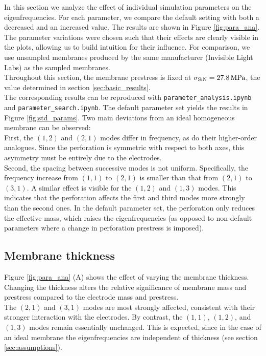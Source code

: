 In this section we analyze the effect of individual simulation parameters on the eigenfrequencies. For each parameter, we compare the default setting with both a decreased and an increased value. The results are shown in Figure \ref{fig:para_ana}. The parameter variations were chosen such that their effects are clearly visible in the plots, allowing us to build intuition for their influence. For comparison, we use unsampled membranes produced by the same manufacturer (Invisible Light Labs) as the sampled membranes.\\
Throughout this section, the membrane prestress is fixed at $\sigma_{\mathrm{SiN}}=\SI{27.8}{\mega\pascal}$, the value determined in section \ref{sec:basic_results}.\\
The corresponding results can be reproduced with \texttt{parameter\_analysis.ipynb} and \texttt{parameter\_search.ipynb}. The default parameter set yields the results in Figure \ref{fig:std_params}. Two main deviations from an ideal homogeneous membrane can be observed:\\
First, the $(1,2)$ and $(2,1)$ modes differ in frequency, as do their higher-order analogues. Since the perforation is symmetric with respect to both axes, this asymmetry must be entirely due to the electrodes.\\
Second, the spacing between successive modes is not uniform. Specifically, the frequency increase from $(1,1)$ to $(2,1)$ is smaller than that from $(2,1)$ to $(3,1)$. A similar effect is visible for the $(1,2)$ and $(1,3)$ modes. This indicates that the perforation affects the first and third modes more strongly than the second ones. In the default parameter set, the perforation only reduces the effective mass, which raises the eigenfrequencies (as opposed to non-default parameters where a change in perforation prestress is imposed).\\

\subsection{Membrane thickness}
Figure \ref{fig:para_ana} (A) shows the effect of varying the membrane thickness.\\
Changing the thickness alters the relative significance of membrane mass and prestress compared to the electrode mass and prestress.\\
The $(2,1)$ and $(3,1)$ modes are most strongly affected, consistent with their stronger interaction with the electrodes. By contrast, the $(1,1)$, $(1,2)$, and $(1,3)$ modes remain essentially unchanged. This is expected, since in the case of an ideal membrane the eigenfrequencies are independent of thickness (see section \ref{sec:assumptions}).\\

